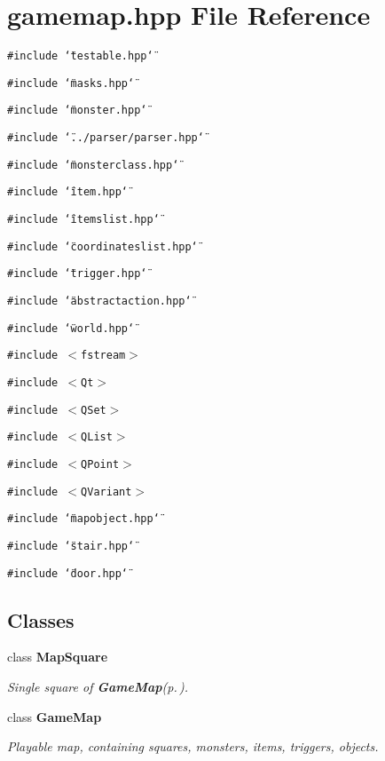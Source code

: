 \section{gamemap.hpp File Reference}
\label{gamemap_8hpp}
{\tt \#include \char`\"{}testable.hpp\char`\"{}}\par
{\tt \#include \char`\"{}masks.hpp\char`\"{}}\par
{\tt \#include \char`\"{}monster.hpp\char`\"{}}\par
{\tt \#include \char`\"{}../parser/parser.hpp\char`\"{}}\par
{\tt \#include \char`\"{}monsterclass.hpp\char`\"{}}\par
{\tt \#include \char`\"{}item.hpp\char`\"{}}\par
{\tt \#include \char`\"{}itemslist.hpp\char`\"{}}\par
{\tt \#include \char`\"{}coordinateslist.hpp\char`\"{}}\par
{\tt \#include \char`\"{}trigger.hpp\char`\"{}}\par
{\tt \#include \char`\"{}abstractaction.hpp\char`\"{}}\par
{\tt \#include \char`\"{}world.hpp\char`\"{}}\par
{\tt \#include $<$fstream$>$}\par
{\tt \#include $<$Qt$>$}\par
{\tt \#include $<$QSet$>$}\par
{\tt \#include $<$QList$>$}\par
{\tt \#include $<$QPoint$>$}\par
{\tt \#include $<$QVariant$>$}\par
{\tt \#include \char`\"{}mapobject.hpp\char`\"{}}\par
{\tt \#include \char`\"{}stair.hpp\char`\"{}}\par
{\tt \#include \char`\"{}door.hpp\char`\"{}}\par
\subsection*{Classes}
\begin{CompactItemize}
\item 
class {\bf Map\-Square}
\begin{CompactList}\small\item\em Single square of {\bf Game\-Map}{\rm (p.\,\pageref{classGameMap})}. \item\end{CompactList}\item 
class {\bf Game\-Map}
\begin{CompactList}\small\item\em Playable map, containing squares, monsters, items, triggers, objects. \item\end{CompactList}\end{CompactItemize}
